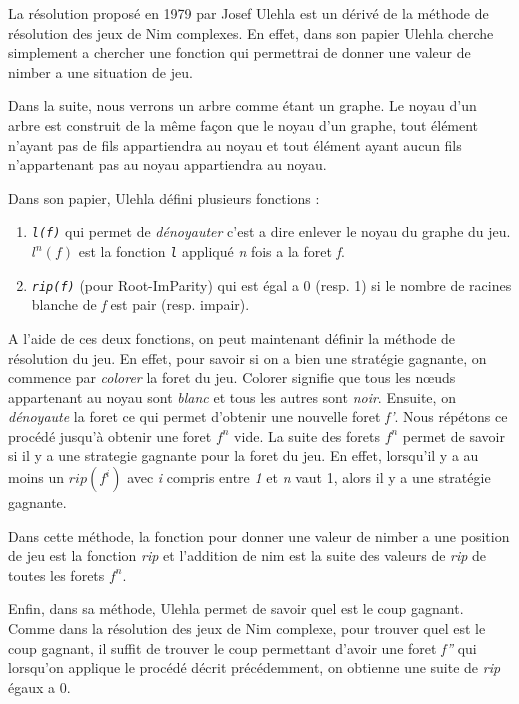  La résolution proposé en 1979 par Josef Ulehla est un dérivé de la méthode de résolution des jeux de Nim complexes. En effet, dans son papier \cite{} Ulehla cherche simplement a chercher une fonction qui permettrai de donner une valeur de nimber a une situation de jeu.

  Dans la suite, nous verrons un arbre comme étant un graphe. Le noyau d'un arbre est construit de la même façon que le noyau d'un graphe, tout élément n'ayant pas de fils appartiendra au noyau et tout élément ayant aucun fils n'appartenant pas au noyau appartiendra au noyau.

  Dans son papier, Ulehla défini plusieurs fonctions :
  \begin{enumerate}
    \item \textit{\texttt{l(f)}} qui permet de \textit{dénoyauter} c'est a dire enlever le noyau du graphe du jeu. $l^n(f)$ est la fonction \textit{\texttt{l}} appliqué \textit{n} fois a la foret \textit{f}.
    \item\textit{\texttt{rip(f)}} (pour Root-ImParity) qui est égal a 0 (resp. 1) si le nombre de racines blanche de \textit{f} est pair (resp. impair).
  \end{enumerate}

  A l'aide de ces deux fonctions, on peut maintenant définir la méthode de résolution du jeu. En effet, pour savoir si on a bien une stratégie gagnante, on commence par \textit{colorer} la foret du jeu. Colorer signifie que tous les nœuds appartenant au noyau sont \textit{blanc} et tous les autres sont \textit{noir}. Ensuite, on \textit{dénoyaute} la foret ce qui permet d'obtenir une nouvelle foret \textit{f'}. Nous répétons ce procédé jusqu’à obtenir une foret $f^n$ vide. La suite des forets $f^n$ permet de savoir si il y a une strategie gagnante pour la foret du jeu. En effet, lorsqu'il y a au moins un $rip(f^i)$ avec \textit{i} compris entre \textit{1} et \textit{n} vaut 1, alors il y a une stratégie gagnante.

  Dans cette méthode, la fonction pour donner une valeur de nimber a une position de jeu est la fonction \textit{rip} et l'addition de nim est la suite des valeurs de \textit{rip} de toutes les forets $f^n$.

  Enfin, dans sa méthode, Ulehla permet de savoir quel est le coup gagnant. Comme dans la résolution des jeux de Nim complexe, pour trouver quel est le coup gagnant, il suffit de trouver le coup permettant d'avoir une foret \textit{f''} qui lorsqu'on applique le procédé décrit précédemment, on obtienne une suite de \textit{rip} égaux a 0.

